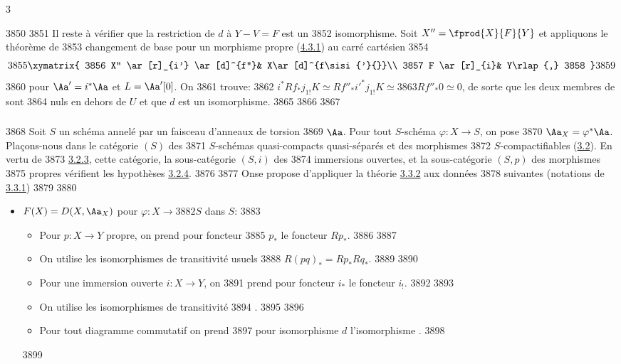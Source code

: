 3	\documentclass[10pt]{../fichiers-configuration-latex/smfart}
\begin{document}
  3850	
  3851	Il reste à vérifier que la restriction de $d$ à $Y-V=F$ est un
  3852	isomorphisme. Soit $X''=\fprod{X}{F}{Y}$ et appliquons le théorème de
  3853	changement de base pour un morphisme propre (\hyperref[XVII.thm4.3.1]{4.3.1}) au carré cartésien
  3854	\[
  3855	\xymatrix{
  3856	X'' \ar[r]_{i'} \ar[d]^{f''}& X\ar[d]^{f\sisi{'}{}}\\
  3857	F   \ar[r]_{i}& Y\rlap{,}
  3858	}
  3859	\]
  3860	pour $\Aa'=i^{\ast}\Aa$ et $L=\Aa'[0]$. On
  3861	trouve:
  3862	$i^{\ast}Rf_{\ast}j_{1!}K\simeq Rf''_{\ast}{i'}^{\ast}j_{1!}K\simeq
  3863	Rf''_{\ast}0\simeq 0$, de sorte que les deux membres de  sont
  3864	nuls en dehors de $U$ et que $d$ est un isomorphisme.
  3865	
  3866	\setcounter{subsubsection}{6}
  3867	\subsubsection{}
  3868	Soit $S$ un schéma annelé par un faisceau d'anneaux de torsion
  3869	$\Aa$. Pour tout $S$-schéma $\varphi:X\rightarrow S$, on pose
  3870	$\Aa_X=\varphi^{\ast}\Aa$. Plaçons-nous dans le catégorie $(S)$ des
  3871	$S$-schémas quasi-compacts quasi-séparés et des morphismes
  3872	$S$-compactifiables (\hyperref[XVII.subsec3.2]{3.2}). En vertu de
  3873	\hyperref[XVII.prop3.2.3]{3.2.3}, cette catégorie, la sous-catégorie $(S,i)$ des
  3874	immersions ouvertes, et la sous-catégorie $(S,p)$ des morphismes
  3875	propres vérifient les hypothèses \hyperref[XVII.subsubsec3.2.4]{3.2.4}.
  3876	
  3877	On\pageoriginale se propose d'appliquer la théorie \hyperref[XVII.prop3.3.2]{3.3.2} aux données
  3878	suivantes (notations de \hyperref[XVII.subsubsec3.3.1]{3.3.1})
  3879	
  3880	\begin{itemize}
  3881	\item[$\alpha$)] $F(X)=D(X,\Aa_X)$ pour $\varphi:X\rightarrow
  3882	S$ dans $S$:
  3883	\begin{itemize}
  3884	\item[(i)] Pour $p:X\rightarrow Y$ propre, on prend pour foncteur
  3885	$p_{\ast}$ le foncteur $Rp_{\ast}$.
  3886	
  3887	\item[(ii)] On utilise les isomorphismes de transitivité usuels
  3888	$R(pq)_{\ast}=Rp_{\ast}Rq_{\ast}$.
  3889	
  3890	\item[${\rm(i')}$] Pour une immersion ouverte $i:X\rightarrow Y$, on
  3891	prend pour foncteur $i_{\ast}$ le foncteur $i_{!}$.
  3892	
  3893	\item[${\rm(ii')}$] On utilise les isomorphismes de transitivité
  3894	.
  3895	
  3896	\item[${\rm(iii)}$] Pour tout diagramme commutatif  on prend
  3897	pour isomorphisme $d$ l'isomorphisme .
  3898	\end{itemize}
  3899	\end{itemize}
\end{document}
